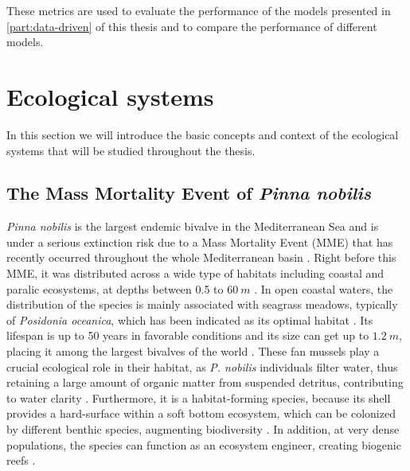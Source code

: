These metrics are used to evaluate the performance of the models presented in
\cref{part:data-driven} of this thesis and to compare the performance of
different models.

\section{\label{sec:Ecological systems} Ecological
  systems}

In this section we will introduce the basic concepts and context of the
ecological systems that will be studied throughout the thesis.

\subsection{\label{sec:The Mass Mortality Event of Pinna nobilis} The Mass
  Mortality Event of \textit{Pinna nobilis}}

\textit{Pinna nobilis} is the largest endemic bivalve in the Mediterranean
Sea and is under a serious extinction risk due to a Mass Mortality Event (MME)
that has recently occurred throughout the whole Mediterranean basin
\cite{March, ZOTOU2020, VAZQUEZ2017}. Right before this
MME, it was distributed across a wide type of habitats including coastal and
paralic ecosystems, at depths between 0.5 to $\SI{60}{m}$
\cite{butler1993ecology, PRADO2020105220}. In open coastal waters, the
distribution of the species is mainly associated with seagrass meadows,
typically of \textit{Posidonia oceanica}, which has been indicated as its
optimal habitat \cite{Hendriks2011}. Its lifespan is up to 50 years in
favorable conditions and its size can get up to $\SI{1.2}{m}$, placing it
among the largest bivalves of the  world \cite{Cabanellas2019}. These fan
mussels play a crucial ecological role in their habitat, as \textit{P.
  nobilis}
individuals filter water, thus retaining a large amount of organic matter
from
suspended detritus, contributing to water clarity \cite{TRIGOS2014}.
Furthermore, it is a habitat-forming species, because its shell provides a
hard-surface within a soft bottom ecosystem, which can be colonized by
different benthic species, augmenting biodiversity \cite{Cabanellas2019}. In
addition, at very dense populations, the species can function as an ecosystem
engineer, creating biogenic reefs \cite{katsanevakis2016transplantation}.

